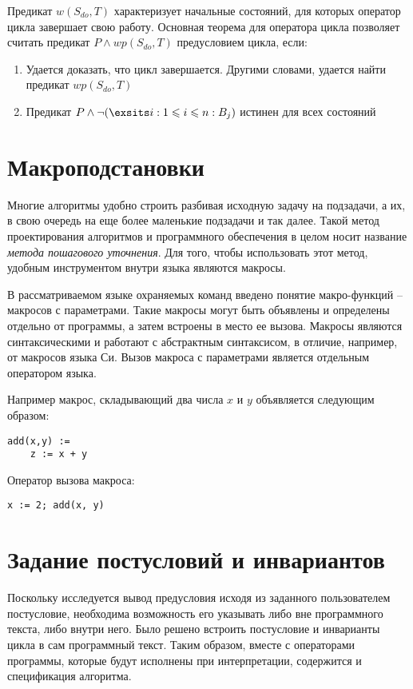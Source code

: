 Предикат $w(S_{do}, T)$ характеризует начальные состояний, для которых оператор цикла завершает свою работу.
Основная теорема для оператора цикла позволяет считать предикат $P \wedge wp(S_{do}, T)$ предусловием цикла, если:
\begin{enumerate}
	\item Удается доказать, что цикл завершается. Другими словами, удается найти предикат $wp(S_{do}, T)$
	\item Предикат $P \wedge \neg (\exsits i: 1 \leq i \leq n: B_j)$ истинен для всех состояний
\end{enumerate}

\section{Макроподстановки}
Многие алгоритмы удобно строить разбивая исходную задачу на подзадачи, а их, в свою очередь
на еще более маленькие подзадачи и так далее. Такой метод проектирования алгоритмов и программного
обеспечения в целом носит название \textit{метода пошагового уточнения}. Для
того, чтобы использовать этот метод, удобным инструментом внутри языка являются макросы.

В рассматриваемом языке охраняемых команд введено понятие макро-функций -- макросов с параметрами.
Такие макросы могут быть объявлены и определены отдельно от программы, а затем встроены в место ее вызова. Макросы
являются синтаксическими и работают с абстрактным синтаксисом, в отличие, например, от макросов языка Си.
Вызов макроса с параметрами является отдельным оператором языка. 

Например макрос, складывающий два числа $x$ и $y$ объявляется следующим образом:

\begin{verbatim}
add(x,y) :=
    z := x + y 
\end{verbatim}

Оператор вызова макроса:

\begin{verbatim}
x := 2; add(x, y)
\end{verbatim}

\section{Задание постусловий и инвариантов}
Поскольку исследуется вывод предусловия исходя из заданного пользователем постусловие, необходима
возможность его указывать либо вне программного текста, либо внутри него. Было решено
встроить постусловие и инварианты цикла в сам программный текст. Таким образом,
вместе с операторами программы, которые будут исполнены при интерпретации, содержится и
спецификация алгоритма. 

